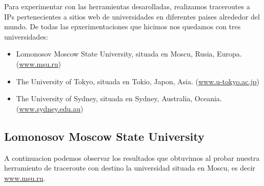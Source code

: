 Para experimentar con las herramientas desarolladas, realizamos traceroutes a IPs pertenecientes a sitios web de universidades en diferentes paises alrededor del mundo. De todas las epxerimentaciones que hicimos nos quedamos con tres universidades:
\begin{itemize}
  \item Lomonosov Moscow State University, situada en Moscu, Rusia, Europa. (\url{www.msu.ru})
  \item The University of Tokyo, situada en Tokio, Japon, Asia. (\url{www.u-tokyo.ac.jp})
  \item The University of Sydney, situada en Sydney, Australia, Oceania. (\url{www.sydney.edu.au})
\end{itemize}

\subsection{Lomonosov Moscow State University}
A continuacion podemos observar los resultados que obtuvimos al probar nuestra herramiento de traceroute
con destino la universidad situada en Moscu, es decir \url{www.msu.ru}.

